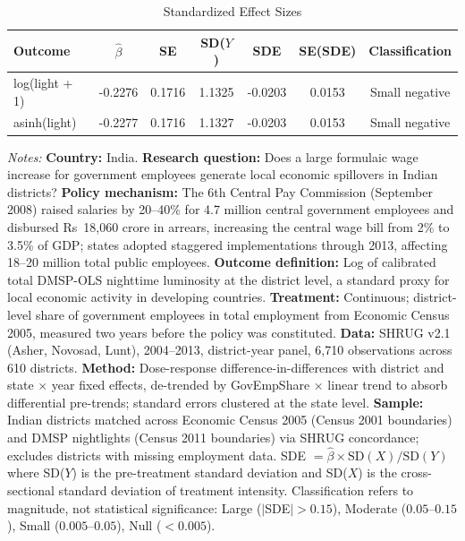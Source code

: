 \begin{table}[t]
\centering
\caption{Standardized Effect Sizes}
\label{tab:sde}
\begin{tabular}{lcccccc}
\toprule
Outcome & $\hat{\beta}$ & SE & SD($Y$) & SDE & SE(SDE) & Classification \\
\midrule
log(light + 1) & -0.2276 & 0.1716 & 1.1325 & -0.0203 & 0.0153 & Small negative \\
asinh(light) & -0.2277 & 0.1716 & 1.1327 & -0.0203 & 0.0153 & Small negative \\
\bottomrule
\end{tabular}
\begin{tablenotes}
\item \textit{Notes:} \textbf{Country:} India. \textbf{Research question:} Does a large formulaic wage increase for government employees generate local economic spillovers in Indian districts? \textbf{Policy mechanism:} The 6th Central Pay Commission (September 2008) raised salaries by 20--40\% for 4.7 million central government employees and disbursed Rs~18,060 crore in arrears, increasing the central wage bill from 2\% to 3.5\% of GDP; states adopted staggered implementations through 2013, affecting 18--20 million total public employees. \textbf{Outcome definition:} Log of calibrated total DMSP-OLS nighttime luminosity at the district level, a standard proxy for local economic activity in developing countries. \textbf{Treatment:} Continuous; district-level share of government employees in total employment from Economic Census 2005, measured two years before the policy was constituted. \textbf{Data:} SHRUG v2.1 (Asher, Novosad, Lunt), 2004--2013, district-year panel, 6,710 observations across 610 districts. \textbf{Method:} Dose-response difference-in-differences with district and state $\times$ year fixed effects, de-trended by GovEmpShare $\times$ linear trend to absorb differential pre-trends; standard errors clustered at the state level. \textbf{Sample:} Indian districts matched across Economic Census 2005 (Census 2001 boundaries) and DMSP nightlights (Census 2011 boundaries) via SHRUG concordance; excludes districts with missing employment data. SDE $= \hat{\beta} \times \text{SD}(X) / \text{SD}(Y)$ where SD($Y$) is the pre-treatment standard deviation and SD($X$) is the cross-sectional standard deviation of treatment intensity. Classification refers to magnitude, not statistical significance: Large ($|$SDE$| > 0.15$), Moderate ($0.05$--$0.15$), Small ($0.005$--$0.05$), Null ($< 0.005$).
\end{tablenotes}
\end{table}
